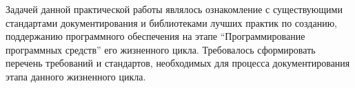 
\pagebreak
{}

Задачей данной практической работы являлось ознакомление с существующими стандартами документирования и библиотеками лучших практик по созданию, поддержанию программного обеспечения на этапе \enquote{Программирование программных средств} его жизненного цикла.
Требовалось сформировать перечень требований и стандартов, необходимых для процесса документирования этапа данного жизненного цикла.
